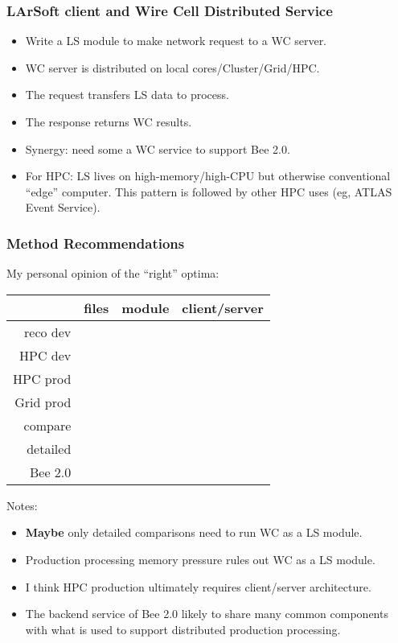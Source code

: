 \documentclass[xcolor=dvipsnames]{beamer}
\newcommand{\cmark}{\ding{51}}%
\begin{document}
\begin{frame}
  \frametitle{LArSoft client and Wire Cell Distributed Service}

  \begin{itemize}
  \item Write a LS module to make network request to a WC server.
  \item WC server is distributed on local cores/Cluster/Grid/HPC.
  \item The request transfers LS data to process.
  \item The response returns WC results.
  \item Synergy: need some a WC service to support Bee 2.0.
  \item For HPC: LS lives on high-memory/high-CPU but otherwise
    conventional ``edge'' computer.  This pattern is followed by other
    HPC uses (eg, ATLAS Event Service).
  \end{itemize}
\end{frame}


\begin{frame}
  \frametitle{Method Recommendations}
  My personal opinion of the ``right'' optima:
  \begin{center}
    \begin{tabular}[h]{|r|c|c|c|}
      \hline
      & files & module & client/server \\
      \hline
      reco dev & \cmark & & \\
      HPC dev & \cmark & & \cmark \\
      HPC prod &  & & \cmark \\
      Grid prod & \cmark & & \cmark \\
      compare & \cmark & & \\
      detailed & \cmark & \cmark & \\
      \hline
      Bee 2.0 &  & & \cmark \\
      \hline
    \end{tabular}
  \end{center}

  Notes:\scriptsize
  \begin{itemize}
  \item \textbf{Maybe} only detailed comparisons need to run WC as a LS module.
  \item Production processing memory pressure rules out WC as a LS module.
  \item I think HPC production ultimately requires client/server architecture.
  \item The backend service of Bee 2.0 likely to share many common
    components with what is used to support distributed production
    processing.
  \end{itemize}
\end{frame}
\end{document}
